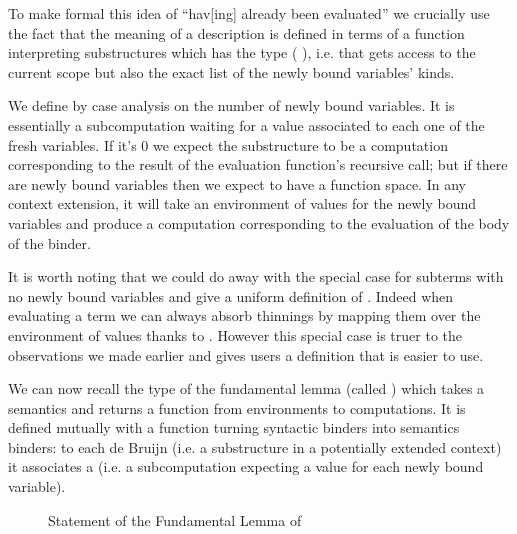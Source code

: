 To make formal this idea of ``hav[ing] already been evaluated'' we
crucially use the fact that the meaning of a description is defined
in terms of a function interpreting substructures which has the type
(   ), i.e. that gets access
to the current scope but also the exact list of the newly bound
variables' kinds.

We define  by case analysis on the number of newly bound
variables. It is essentially a subcomputation waiting for a value
associated to each one of the fresh variables. If it's $0$ we expect
the substructure to be a computation corresponding to the result of
the evaluation function's recursive call; but if there are newly bound
variables then we expect to have a function space. In any context
extension, it will take an environment of values for the newly bound
variables and produce a computation corresponding to the evaluation
of the body of the binder.

{
\label{defn:Kripke}
}

It is worth noting that we could do away with the special case for
subterms with no newly bound variables and give a uniform definition
of . Indeed when evaluating a term we can always absorb
thinnings by mapping them over the environment of values thanks to
.
%
However this special case is truer to the observations we made earlier
and gives users a definition that is easier to use.



We can now recall the type of the fundamental lemma (called ) which
takes a semantics and returns a function from environments to computations. It is
defined mutually with a function  turning syntactic binders into
semantics binders: to each de Bruijn  (i.e. a substructure in a potentially
extended context) it associates a  (i.e. a subcomputation expecting a
value for each newly bound variable).

\begin{figure}[h]
\caption{Statement of the Fundamental Lemma of \label{defn:semantics}}
\end{figure}

